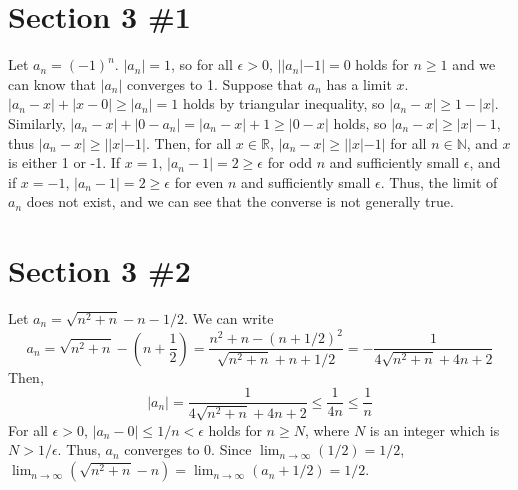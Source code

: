 \documentclass{scrartcl}
\begin{document}
\section{Section 3 \#1}
Let \(a_n = (-1)^n\).
\(|a_n| = 1\), so for all \(\epsilon > 0\), \(||a_n| - 1| = 0\) holds for \(n \geq 1\) and we can know that \(|a_n|\) converges to 1.
Suppose that \(a_n\) has a limit \(x\).
\(|a_n - x| + |x - 0| \geq |a_n| = 1\) holds by triangular inequality, so \(|a_n - x| \geq 1 - |x|\).
Similarly, \(|a_n - x| + |0 - a_n| = |a_n - x| + 1 \geq |0 - x|\) holds, so \(|a_n - x| \geq |x| - 1\), thus \(|a_n - x| \geq ||x| - 1|\).
Then, for all \(x \in \mathbb{R}\), \(|a_n - x| \geq ||x| - 1|\) for all \(n \in \mathbb{N}\), and \(x\) is either 1 or -1.
If \(x = 1\), \(|a_n - 1| = 2 \geq \epsilon\) for odd \(n\) and sufficiently small \(\epsilon\), and if \(x = -1\), \(|a_n - 1| = 2 \geq \epsilon\) for even \(n\) and sufficiently small \(\epsilon\).
Thus, the limit of \(a_n\) does not exist, and we can see that the converse is not generally true.

\section{Section 3 \#2}
Let \(a_n = \sqrt{n^2 + n} - n - 1 / 2\).
We can write
\[
  a_n = \sqrt{n^2 + n} - \left( n + \frac{1}{2} \right) = \frac{n^2 + n - (n + 1 / 2)^2}{\sqrt{n^2 + n} + n + 1/2} = -\frac{1}{4\sqrt{n^2 + n} + 4n + 2}
\]
Then,
\[
  |a_n| = \frac{1}{4\sqrt{n^2 + n} + 4n + 2} \leq \frac{1}{4n} \leq \frac{1}{n}
\]
For all \(\epsilon > 0\), \(|a_n - 0| \leq 1 / n < \epsilon\) holds for \(n \geq N\), where \(N\) is an integer which is \(N > 1 / \epsilon\).
Thus, \(a_n\) converges to \(0\).
Since \(\lim_{n \to \infty} (1 / 2) = 1 / 2\), \(\lim_{n \to \infty} (\sqrt{n^2 + n} - n) = \lim_{n \to \infty} (a_n + 1 / 2) = 1 / 2\).
\end{document}

